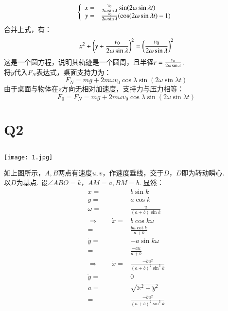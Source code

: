 \documentclass[UTF8,9pt]{ctexart}
\begin{document}
    $$\left\{\begin{array}{rll}
        x=&\frac{v_0}{2\omega\sin\lambda}\sin (2\omega\sin\lambda t)\\
        y=&\frac{v_0}{2\omega\sin\lambda}(\cos (2\omega\sin\lambda t)-1)\\
    \end{array}\right.$$
    合并上式，有：
    $$x^2+\left(y+\frac{v_0}{2\omega\sin\lambda}\right)^2=\left(\frac{v_0}{2\omega\sin\lambda}\right)^2$$
    这是一个圆方程，说明其轨迹是一个圆周，且半径$r=\frac{v_0}{2\omega\sin\lambda}$.\\
    将$\dot{y}$代入$F_N$表达式，桌面支持力为：
    $$F_N=mg+2m\omega v_0 \cos\lambda\sin (2\omega\sin\lambda t)$$
    由于桌面与物体在$z$方向无相对加速度，支持力与压力相等：
    $$F_0=F_N=mg+2m\omega v_0 \cos\lambda\sin (2\omega\sin\lambda t)$$
\section{Q2}
    \subsection{}
        \begin{center}
            \texttt{[image: 1.jpg]}\\ 
        \end{center}
        如上图所示，$A,B$两点有速度$u,v$，作速度垂线，交于$D$，$D$即为转动瞬心.\\
        以$D$为基点. 设$\angle ABO=k$，$AM=a, BM=b$.
        显然：
        $$\begin{array}{rl}
            x=&b\sin k\\
            y=&a\cos k\\
            \omega=&\frac{u}{(a+b)\sin k}\\
            \Rightarrow\qquad
            \dot{x}=&b\cos k \omega\\
            =&\frac{b u\cot k}{a+b}\\
            \dot{y}=&-a\sin k \omega\\
            =&\frac{-au}{a+b}\\
            \Rightarrow\qquad
            \ddot{x}=&\frac{-bu^2}{(a+b)^2\sin^3k}\\
            \ddot{y}=&0\\
            a=&\sqrt{\ddot{x}^2+\ddot{y}^2}\\
            =&\frac{-bu^2}{(a+b)^2\sin^3k}
        \end{array}$$  
        
\end{document}
